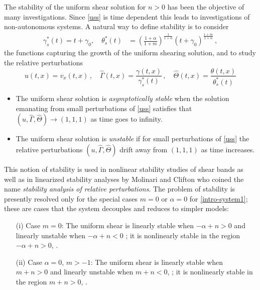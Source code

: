 \documentclass[usletter,11pt]{article}
\theoremstyle{remark}
\begin{document}
The stability of the uniform shear solution for $n > 0$ has been the objective of many investigations. Since \eqref{uss} is time dependent this 
leads to investigations of non-autonomous systems. A natural way to define stability is to consider
\begin{equation} \label{ussgr}
\begin{aligned}
\gamma_s^* (t) = t+\gamma_0,  \quad 
\theta_s^* (t) &=  \left( \tfrac{1+\alpha}{1+m }\right )^{\frac{1}{1+\alpha}}  (t+\gamma_0)^{\frac{1 + m}{1+\alpha}} \, ,
\end{aligned}
\end{equation}
the functions capturing the growth of the uniform shearing solution, and to study the relative perturbations
\begin{equation}
u (t,x) = v_x (t,x) \, , \quad \hat\Gamma (t,x) = \frac{\gamma (t,x)}{\gamma_s^* (t)} \, , \quad \hat\Theta (t,x) = \frac{\theta (t,x)}{\theta_s^* (t)}
\end{equation}
\begin{itemize}
\item
The uniform shear solution is {\it asymptotically stable} when the solution emanating from small perturbations
of \eqref{uss} satisfies that $(u, \hat\Gamma, \hat\Theta) \to (1,1,1)$ as time goes to infinity.
\item
The uniform shear solution is {\it unstable} if for small perturbations of \eqref{uss} the relative perturbations 
$(u, \hat\Gamma, \hat\Theta)$ drift away from $(1,1,1)$ as time increases.
\end{itemize}

This notion of stability is used in nonlinear stability studies of shear bands \cite{DH_1983,Tz_1986} as well as
in linearized stability analyses by  Molinari and Clifton \cite{MC,FM} 
who coined the name {\it stability analysis of relative perturbations}. The problem of stability is presently resolved only for the special cases 
$m=0$ or $\alpha = 0$ for \eqref{intro-system1};  these are cases that the system decouples and reduces to simpler models:
\begin{itemize}
\item[(i)] Case $m=0$: The uniform shear is linearly stable when $-\alpha + n > 0$ and linearly unstable when $-\alpha + n < 0$ \cite{MC,FM};
it is nonlinearly stable in the region $-\alpha + n > 0$, \cite{Tz_1986}.
\item[(ii)] Case $\alpha =0$, $m > -1$: The uniform shear is linearly stable when $m + n > 0$ and linearly unstable when $m+ n < 0$, \cite{FM,tzavaras_nonlinear_1992};
it is nonlinearly stable in the region $m + n > 0$, \cite{tzavaras_plastic_1986}.
\end{itemize}
\end{document}
